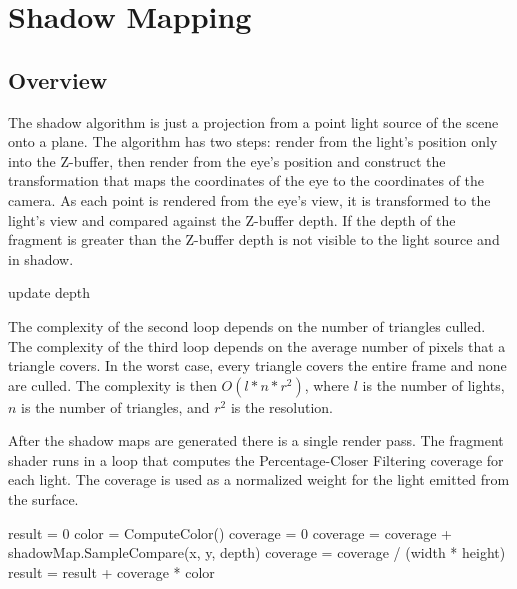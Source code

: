 \documentclass[12pt]{article}
\begin{document}
\section{Shadow Mapping}

\subsection{Overview}

The shadow algorithm is just a projection from a point light source of the scene onto a plane. The algorithm has two steps: render from the light's position only into the Z-buffer, then render from the eye's position and construct the transformation that maps the coordinates of the eye to the coordinates of the camera. As each point is rendered from the eye's view, it is transformed to the light's view and compared against the Z-buffer depth.
If the depth of the fragment is greater than the Z-buffer depth is not visible to the light source and in shadow.


\begin{algorithm}
{
	{
		{
			update depth
		}
	}
}
\end{algorithm}

The complexity of the second loop depends on the number of triangles culled. The complexity of the third loop depends on the average number of pixels that a triangle covers. In the worst case, every triangle covers the entire frame and none are culled.
The complexity is then \(O(l*n*r^2)\), where \(l\) is the number of lights, \(n\) is the number of triangles, and \(r^2\) is the resolution.

After the shadow maps are generated there is a single render pass. The fragment shader runs in a loop that computes the Percentage-Closer Filtering coverage for each light. The coverage is used as a normalized weight for the light emitted from the surface.

\begin{algorithm}
result = 0\;
{
	color = ComputeColor()\;
	coverage = 0\;
	{
		{
			coverage = coverage + shadowMap.SampleCompare(x, y, depth)\;
		}
	}
	coverage = coverage / (width * height)\;
	result = result + coverage * color\;
}
\end{algorithm}
\end{document}
